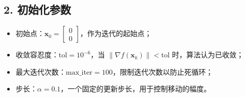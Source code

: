 \documentclass[12pt,a4paper,oneside]{article}
\begin{document}
\subsection*{2. 初始化参数}
\begin{itemize}
    \item 初始点：\(\mathbf{x}_0 = \begin{bmatrix}0 \\ 0\end{bmatrix}\)，作为迭代的起始点；
    \item 收敛容忍度：\(\text{tol} = 10^{-6}\)，当 \(\|\nabla f(\mathbf{x}_k)\| < \text{tol}\) 时，算法认为已收敛；
    \item 最大迭代次数：\(\text{max\_iter} = 100\)，限制迭代次数以防止死循环；
    \item 步长：\(\alpha = 0.1\)，一个固定的更新步长，用于控制移动的幅度。
\end{itemize}
\end{document}

